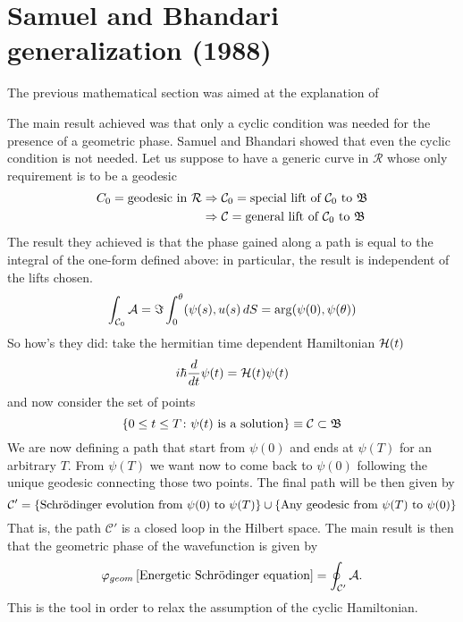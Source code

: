 
\section{Samuel and Bhandari generalization (1988)}
The previous mathematical section was aimed at the explanation of \cite{samuel1988general}

The main result \cite{aharonov1987phase} achieved was that only a cyclic condition was needed for the presence of a geometric phase. Samuel and Bhandari showed that even the cyclic condition is not needed.
Let us suppose to have a generic curve in $ \mathcal{R} $ whose only requirement is to be a geodesic 
\begin{align}
C_0= \text{geodesic in $ \mathcal{R} $}&\Rightarrow \mathcal{C}_0=\text{special lift of $ \mathcal{C}_0 $ to $ \mathfrak{B} $}\\
&\Rightarrow \mathcal{C}=\text{general lift of $ \mathcal{C}_0 $ to $ \mathfrak{B} $}
\end{align}
The result they achieved is that the phase gained along a path is equal to the integral of the one-form defined above: in particular, the result is independent of the lifts chosen.
\begin{equation}
\int_{\mathcal{C}_0}\mathcal{A}=\Im\int_{0}^{\theta}(\psi(s),u(s)\mathop{}\!d S=\arg(\psi(0),\psi(\theta))
\end{equation}
So how's they did: take the hermitian time dependent Hamiltonian $ \mathcal{H}(t) $
\begin{equation}
i\hbar \frac{d}{dt} \psi(t)=\mathcal{H}(t)\psi(t)
\end{equation}
and now consider the set of points 
\begin{equation}
\left\{0\leq t\leq T\colon\psi(t) \text{ is a solution} \right\}\equiv \mathcal{C}\subset \mathfrak{B}
\end{equation}
We are now defining a path that start from $ \psi(0) $ and ends at $ \psi(T) $ for an arbitrary $ T $. From $ \psi(T) $ we want now to come back to $ \psi(0) $ following the unique geodesic connecting those two points. The final path will be then given by
\begin{equation}
\mathcal{C}'=\left\{\text{Schr\"odinger evolution from $ \psi(0) $ to $ \psi(T) $} \right\} \cup \left\{\text{Any geodesic from $ \psi(T) $ to $ \psi(0) $} \right\}
\end{equation}
That is, the path $ \mathcal{C}' $ is a closed loop in the Hilbert space. The main result is then that the geometric phase of the wavefunction is given by
\begin{equation}
\varphi_{geom}\left[\text{Energetic Schr\"odinger equation} \right]=\oint_{\mathcal{C}'}\mathcal{A}.
\end{equation}
This is the tool in order to relax the assumption of the cyclic Hamiltonian.